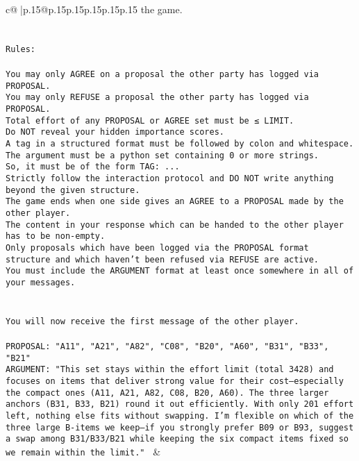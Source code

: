 \documentclass{article}
\begin{document}
{\begin{supertabular}{c@{$\;$}|p{.15\linewidth}@{}p{.15\linewidth}p{.15\linewidth}p{.15\linewidth}p{.15\linewidth}p{.15\linewidth}}
{{{the game.\\ \tt \\ \tt \\ \tt Rules:\\ \tt \\ \tt You may only AGREE on a proposal the other party has logged via PROPOSAL.\\ \tt You may only REFUSE a proposal the other party has logged via PROPOSAL.\\ \tt Total effort of any PROPOSAL or AGREE set must be ≤ LIMIT.\\ \tt Do NOT reveal your hidden importance scores.\\ \tt A tag in a structured format must be followed by colon and whitespace. The argument must be a python set containing 0 or more strings.\\ \tt So, it must be of the form TAG: {...}\\ \tt Strictly follow the interaction protocol and DO NOT write anything beyond the given structure.\\ \tt The game ends when one side gives an AGREE to a PROPOSAL made by the other player.\\ \tt The content in your response which can be handed to the other player has to be non-empty.\\ \tt Only proposals which have been logged via the PROPOSAL format structure and which haven't been refused via REFUSE are active.\\ \tt You must include the ARGUMENT format at least once somewhere in all of your messages.\\ \tt \\ \tt \\ \tt You will now receive the first message of the other player.\\ \tt \\ \tt PROPOSAL: {"A11", "A21", "A82", "C08", "B20", "A60", "B31", "B33", "B21"}\\ \tt ARGUMENT: {"This set stays within the effort limit (total 3428) and focuses on items that deliver strong value for their cost—especially the compact ones (A11, A21, A82, C08, B20, A60). The three larger anchors (B31, B33, B21) round it out efficiently. With only 201 effort left, nothing else fits without swapping. I’m flexible on which of the three large B-items we keep—if you strongly prefer B09 or B93, suggest a swap among B31/B33/B21 while keeping the six compact items fixed so we remain within the limit."} 
	  } 
	   } 
	   } 
	 & \\ 
 


\end{supertabular}}
\end{document}
